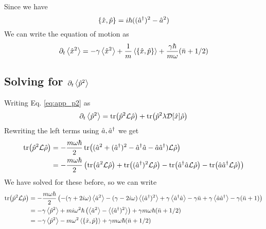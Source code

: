 Since we have
\begin{equation}
    \acomm{\xop}{\pop} = i\hbar ((\ad)^2 - \a^2)
\end{equation}
We can write the equation of motion as
\begin{equation}
    \dt\expval{\xop^2} = - \gamma \expval{\xop^2} + \frac{1}{m}\expval{\acomm{\xop}{\pop}} + \frac{\gamma \hbar}{m\omega}(\nbar + 1/2)
\end{equation}

\subsection{Solving for $\partial_t\expval{\hat{p}^2}$}
Writing Eq. \eqref{eq:app_p2} as 
\begin{equation}
    \partial_t\expval{\hat{p}^2} = \tr(\hat{p}^2 \mathcal{L}\hat{\rho}) + \tr(\hat{p}^2 \lambda \mathcal{D}[\hat{x}] \hat{\rho})\label{eq:app_p2b}
\end{equation}
Rewriting the left terms using $\hat{a},\hat{a}^{\dagger}$ we get
\begin{align}
    \tr(\hat{p}^2\mathcal{L}\hat{\rho}) &= -\frac{m\omega \hbar}{2} \tr((\hat{a}^2 + (\hat{a}^{\dagger})^2 - \hat{a}^{\dagger}\hat{a} - \hat{a}\hat{a}^{\dagger})\mathcal{L}\hat{\rho})\\
    &= -\frac{m\omega \hbar}{2} \left( \tr(\hat{a}^2\mathcal{L}\hat{\rho}) + \tr((\hat{a}^{\dagger})^2\mathcal{L}\hat{\rho}) - \tr(\hat{a}^{\dagger}\hat{a}\mathcal{L}\hat{\rho}) - \tr(\hat{a}\hat{a}^{\dagger}\mathcal{L}\hat{\rho}) \right)
\end{align}
We have solved for these before, so we can write 
\begin{align}
    \tr(\pop^2\liouvillian\dmatrix) &= -\frac{m\omega \hbar}{2} \left( -(\gamma + 2i\omega) \expval{\a^2} -(\gamma - 2i\omega) \expval{(\ad)^2} +\gamma \expval{\ad\a} - \gamma\nbar +\gamma \expval{\a\ad} - \gamma(\nbar + 1)  \right)\\
    &= -\gamma \expval{\pop^2} + m i\omega^2 \hbar \left( \expval{\a^2} - \expval{(\ad)^2} \right) + \gamma m \omega\hbar (\nbar + 1/2)\\
    &= -\gamma \expval{\pop^2} - m\omega^2 \expval{\acomm{\xop}{\pop}} + \gamma m \omega\hbar (\nbar + 1/2)
\end{align}

